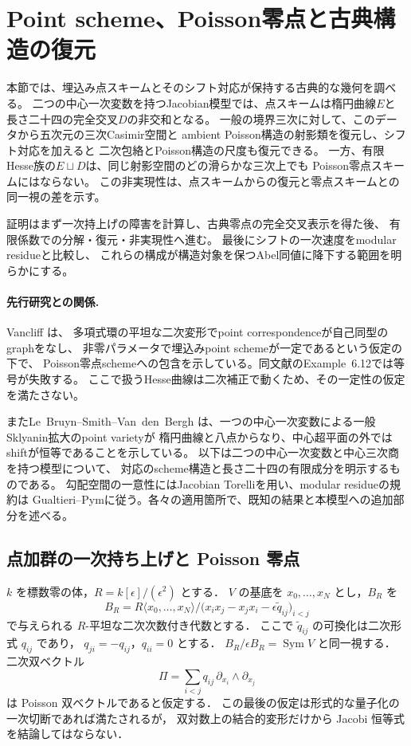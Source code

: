 \section{Point scheme、Poisson零点と古典構造の復元}
\label{sec:point-scheme-poisson}

本節では、埋込み点スキームとそのシフト対応が保持する古典的な幾何を調べる。
二つの中心一次変数を持つJacobian模型では、点スキームは楕円曲線$E$と
長さ二十四の完全交叉$D$の非交和となる。
一般の境界三次に対して、このデータから五次元の三次Casimir空間と
ambient Poisson構造の射影類を復元し、シフト対応を加えると
二次包絡とPoisson構造の尺度も復元できる。
一方、有限Hesse族の$E\sqcup D$は、同じ射影空間のどの滑らかな三次上でも
Poisson零点スキームにはならない。
この非実現性は、点スキームからの復元と零点スキームとの同一視の差を示す。

証明はまず一次持上げの障害を計算し、古典零点の完全交叉表示を得た後、
有限係数での分解・復元・非実現性へ進む。
最後にシフトの一次速度をmodular residueと比較し、
これらの構成が構造対象を保つAbel同値に降下する範囲を明らかにする。

\paragraph{先行研究との関係.}
Vancliff \cite[\S6, Proposition~6.17 and Theorem~6.18]{VancliffQuantumSpaces}は、
多項式環の平坦な二次変形でpoint correspondenceが自己同型のgraphをなし、
非零パラメータで埋込みpoint schemeが一定であるという仮定の下で、
Poisson零点schemeへの包含を示している。同文献のExample~6.12では等号が失敗する。
ここで扱うHesse曲線は二次補正で動くため、その一定性の仮定を満たさない。

またLe~Bruyn--Smith--Van~den~Bergh
\cite[Theorem~4.2.2 and Proposition~4.3.7(1)]{LeBruynSmithVdBCentral}
は、一つの中心一次変数による一般Sklyanin拡大のpoint varietyが
楕円曲線と八点からなり、中心超平面の外ではshiftが恒等であることを示している。
以下は二つの中心一次変数と中心三次商を持つ模型について、
対応のscheme構造と長さ二十四の有限成分を明示するものである。
勾配空間の一意性にはJacobian Torelliを用い、modular residueの規約は
Gualtieri--Pymに従う。各々の適用箇所で、既知の結果と本模型への追加部分を述べる。


\subsection{点加群の一次持ち上げと Poisson 零点}

$k$ を標数零の体，$R=k[\epsilon]/(\epsilon^2)$ とする．
$V$ の基底を $x_0,\ldots,x_N$ とし，$B_R$ を
\[
 B_R=R\langle x_0,\ldots,x_N\rangle/
 \bigl(x_ix_j-x_jx_i-\epsilon\widetilde q_{ij}\bigr)_{i<j}
\]
で与えられる $R$-平坦な二次次数付き代数とする．
ここで $\widetilde q_{ij}$ の可換化は二次形式 $q_{ij}$ であり，
$q_{ji}=-q_{ij}$，$q_{ii}=0$ とする．
$B_R/\epsilon B_R=\operatorname{Sym}V$ と同一視する．
二次双ベクトル
\[
 \Pi=\sum_{i<j}q_{ij}\,\partial_{x_i}\wedge\partial_{x_j}
\]
は Poisson 双ベクトルであると仮定する．
この最後の仮定は形式的な量子化の一次切断であれば満たされるが，
双対数上の結合的変形だけから Jacobi 恒等式を結論してはならない．

